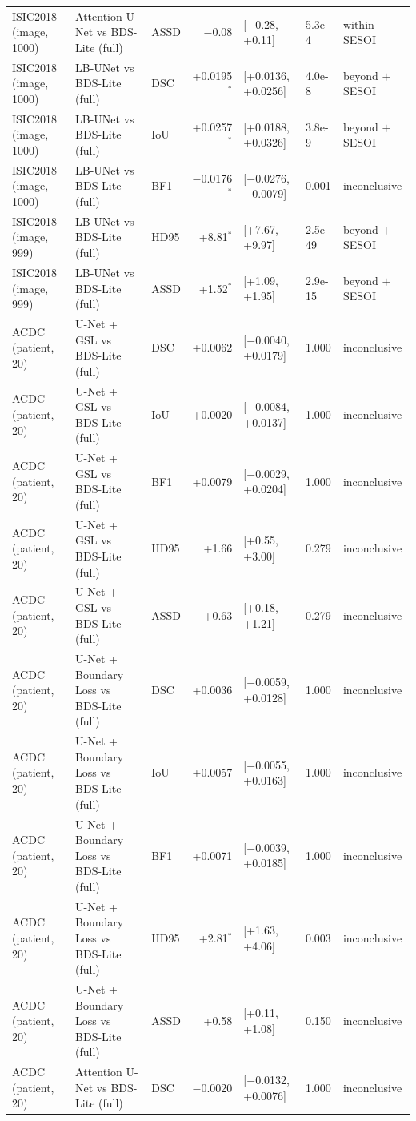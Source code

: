 \begin{tabular}{lllrlll}
ISIC2018 (image, 1000) & Attention U-Net vs BDS-Lite (full) & ASSD & $-$0.08 & [$-$0.28, +0.11] & 5.3e-4 & within SESOI \\
ISIC2018 (image, 1000) & LB-UNet vs BDS-Lite (full) & DSC & +0.0195$^{*}$ & [+0.0136, +0.0256] & 4.0e-8 & beyond $+$SESOI \\
ISIC2018 (image, 1000) & LB-UNet vs BDS-Lite (full) & IoU & +0.0257$^{*}$ & [+0.0188, +0.0326] & 3.8e-9 & beyond $+$SESOI \\
ISIC2018 (image, 1000) & LB-UNet vs BDS-Lite (full) & BF1 & $-$0.0176$^{*}$ & [$-$0.0276, $-$0.0079] & 0.001 & inconclusive \\
ISIC2018 (image, 999) & LB-UNet vs BDS-Lite (full) & HD95 & +8.81$^{*}$ & [+7.67, +9.97] & 2.5e-49 & beyond $+$SESOI \\
ISIC2018 (image, 999) & LB-UNet vs BDS-Lite (full) & ASSD & +1.52$^{*}$ & [+1.09, +1.95] & 2.9e-15 & beyond $+$SESOI \\
\midrule
ACDC (patient, 20) & U-Net + GSL vs BDS-Lite (full) & DSC & +0.0062 & [$-$0.0040, +0.0179] & 1.000 & inconclusive \\
ACDC (patient, 20) & U-Net + GSL vs BDS-Lite (full) & IoU & +0.0020 & [$-$0.0084, +0.0137] & 1.000 & inconclusive \\
ACDC (patient, 20) & U-Net + GSL vs BDS-Lite (full) & BF1 & +0.0079 & [$-$0.0029, +0.0204] & 1.000 & inconclusive \\
ACDC (patient, 20) & U-Net + GSL vs BDS-Lite (full) & HD95 & +1.66 & [+0.55, +3.00] & 0.279 & inconclusive \\
ACDC (patient, 20) & U-Net + GSL vs BDS-Lite (full) & ASSD & +0.63 & [+0.18, +1.21] & 0.279 & inconclusive \\
ACDC (patient, 20) & U-Net + Boundary Loss vs BDS-Lite (full) & DSC & +0.0036 & [$-$0.0059, +0.0128] & 1.000 & inconclusive \\
ACDC (patient, 20) & U-Net + Boundary Loss vs BDS-Lite (full) & IoU & +0.0057 & [$-$0.0055, +0.0163] & 1.000 & inconclusive \\
ACDC (patient, 20) & U-Net + Boundary Loss vs BDS-Lite (full) & BF1 & +0.0071 & [$-$0.0039, +0.0185] & 1.000 & inconclusive \\
ACDC (patient, 20) & U-Net + Boundary Loss vs BDS-Lite (full) & HD95 & +2.81$^{*}$ & [+1.63, +4.06] & 0.003 & inconclusive \\
ACDC (patient, 20) & U-Net + Boundary Loss vs BDS-Lite (full) & ASSD & +0.58 & [+0.11, +1.08] & 0.150 & inconclusive \\
ACDC (patient, 20) & Attention U-Net vs BDS-Lite (full) & DSC & $-$0.0020 & [$-$0.0132, +0.0076] & 1.000 & inconclusive \\

\end{tabular}
